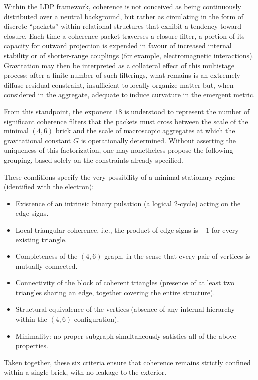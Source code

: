 \documentclass[11pt,a4paper]{article}
\begin{document}
Within the LDP framework, coherence is not conceived as being continuously distributed over a neutral background, but rather as circulating in the form of discrete “packets” within relational structures that exhibit a tendency toward closure. Each time a coherence packet traverses a closure filter, a portion of its capacity for outward projection is expended in favour of increased internal stability or of shorter-range couplings (for example, electromagnetic interactions). Gravitation may then be interpreted as a collateral effect of this multistage process: after a finite number of such filterings, what remains is an extremely diffuse residual constraint, insufficient to locally organize matter but, when considered in the aggregate, adequate to induce curvature in the emergent metric.

From this standpoint, the exponent \(18\) is understood to represent the number of significant coherence filters that the packets must cross between the scale of the minimal \((4,6)\) brick and the scale of macroscopic aggregates at which the gravitational constant \(G\) is operationally determined. Without asserting the uniqueness of this factorization, one may nonetheless propose the following grouping, based solely on the constraints already specified.

These conditions specify the very possibility of a minimal stationary regime (identified with the electron):
\begin{itemize}[label=-]
    \item Existence of an intrinsic binary pulsation (a logical 2-cycle) acting on the edge signs.
    \item Local triangular coherence, i.e., the product of edge signs is \(+1\) for every existing triangle.
    \item Completeness of the \((4,6)\) graph, in the sense that every pair of vertices is mutually connected.
    \item Connectivity of the block of coherent triangles (presence of at least two triangles sharing an edge, together covering the entire structure).
    \item Structural equivalence of the vertices (absence of any internal hierarchy within the \((4,6)\) configuration).
    \item Minimality: no proper subgraph simultaneously satisfies all of the above properties.
\end{itemize}
Taken together, these six criteria ensure that coherence remains strictly confined within a single brick, with no leakage to the exterior.
\end{document}
